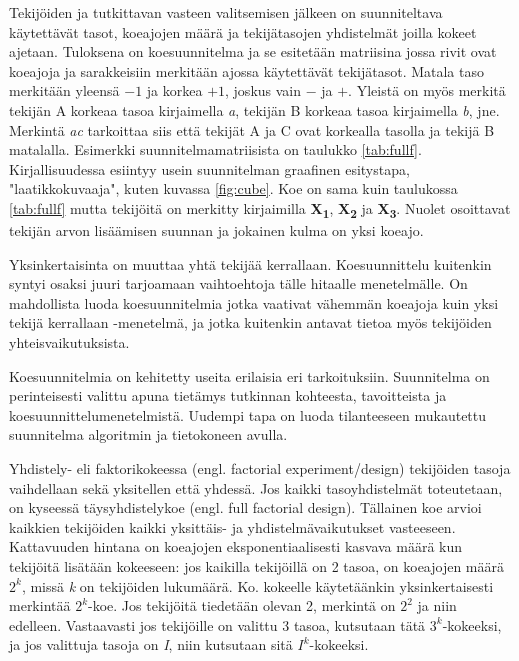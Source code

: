 \documentclass[12pt,a4paper,finnish]{tutthesis}
\begin{document}
Tekijöiden ja tutkittavan vasteen valitsemisen jälkeen on suunniteltava käytettävät
tasot, koeajojen määrä ja tekijätasojen yhdistelmät joilla kokeet ajetaan.
Tuloksena on koesuunnitelma ja se esitetään matriisina jossa rivit ovat
koeajoja ja sarakkeisiin merkitään ajossa käytettävät tekijätasot.
Matala taso merkitään yleensä $-1$ ja korkea $+1$, joskus vain $-$ ja $+$.
Yleistä on myös merkitä tekijän A korkeaa tasoa kirjaimella \textit{a}, tekijän
B korkeaa tasoa kirjaimella \textit{b}, jne. Merkintä \textit{ac} tarkoittaa siis
että
tekijät A ja C ovat korkealla tasolla ja tekijä B matalalla. Esimerkki
suunnitelmamatriisista on taulukko \ref{tab:fullf}.
Kirjallisuudessa esiintyy usein suunnitelman graafinen esitystapa,
"laatikkokuvaaja", kuten kuvassa \ref{fig:cube}.
Koe on sama kuin taulukossa \ref{tab:fullf} mutta tekijöitä on
merkitty kirjaimilla \textbf{X\textsubscript{1}}, \textbf{X\textsubscript{2}}
ja \textbf{X\textsubscript{3}}. Nuolet osoittavat tekijän arvon lisäämisen
suunnan ja jokainen kulma on yksi koeajo.

Yksinkertaisinta on muuttaa yhtä tekijää kerrallaan. Koesuunnittelu kuitenkin syntyi
osaksi juuri tarjoamaan vaihtoehtoja tälle hitaalle menetelmälle. On mahdollista luoda
koesuunnitelmia jotka vaativat vähemmän koeajoja kuin yksi tekijä kerrallaan -menetelmä,
ja jotka kuitenkin antavat tietoa myös tekijöiden yhteisvaikutuksista.

Koesuunnitelmia on kehitetty useita erilaisia eri tarkoituksiin.
Suunnitelma on perinteisesti valittu apuna tietämys
tutkinnan kohteesta, tavoitteista ja koesuunnittelumenetelmistä.
Uudempi tapa on luoda tilanteeseen
mukautettu suunnitelma algoritmin ja tietokoneen avulla.

Yhdistely- eli faktorikokeessa (engl. factorial experiment/design) tekijöiden
tasoja vaihdellaan sekä yksitellen että yhdessä. Jos kaikki tasoyhdistelmät
toteutetaan, on kyseessä täysyhdistelykoe (engl.
full factorial design). Tällainen koe arvioi kaikkien tekijöiden kaikki yksittäis-
ja yhdistelmävaikutukset vasteeseen. Kattavuuden hintana on koeajojen
eksponentiaalisesti kasvava määrä kun tekijöitä lisätään kokeeseen: jos kaikilla
tekijöillä on 2 tasoa, on koeajojen määrä \(2^k\),
missä \textit{k} on
tekijöiden lukumäärä. Ko. kokeelle käytetäänkin yksinkertaisesti
merkintää \(2^k\)-koe.
Jos tekijöitä tiedetään olevan 2, merkintä on
\(2^2\) ja niin edelleen. Vastaavasti jos tekijöille on valittu 3 tasoa,
kutsutaan tätä \(3^k\)-kokeeksi, ja jos valittuja tasoja on \textit{I},
niin kutsutaan sitä \(I^k\)-kokeeksi.
\end{document}
